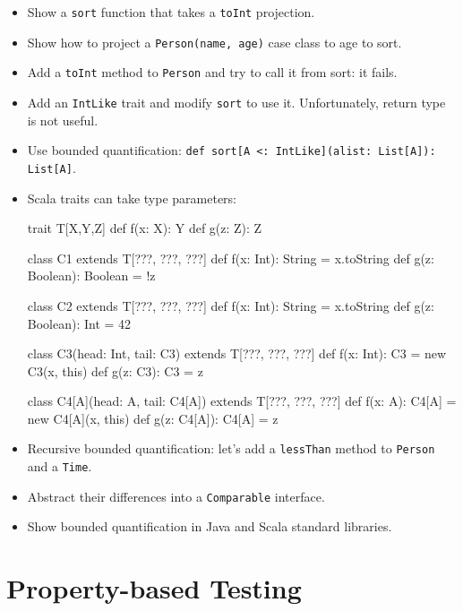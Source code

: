 \documentclass[9pt]{extbook}
\begin{document}
\begin{itemize}

  \item Show a \lstinline|sort| function that takes a \lstinline|toInt| projection.

  \item Show how to project a \lstinline|Person(name, age)| case class to age to sort.

  \item Add a \lstinline|toInt| method to \lstinline|Person| and try to call it from sort: it fails.

  \item Add an \lstinline|IntLike| trait and modify \lstinline|sort| to use it. Unfortunately, return
    type is not useful.

  \item Use bounded quantification: \lstinline|def sort[A <: IntLike](alist: List[A]): List[A]|.

  \item Scala traits can take type parameters:

    \begin{scalacode}
trait T[X,Y,Z] {
  def f(x: X): Y
  def g(z: Z): Z
}

class C1 extends T[???, ???, ???] {
  def f(x: Int): String = x.toString
  def g(z: Boolean): Boolean = !z
}

class C2 extends T[???, ???, ???] {
  def f(x: Int): String = x.toString
  def g(z: Boolean): Int = 42
}

class C3(head: Int, tail: C3) extends T[???, ???, ???] {
  def f(x: Int): C3 = new C3(x, this)
  def g(z: C3): C3 = z
}

class C4[A](head: A, tail: C4[A]) extends T[???, ???, ???] {
  def f(x: A): C4[A] = new C4[A](x, this)
  def g(z: C4[A]): C4[A] = z
}
\end{scalacode}


\item Recursive bounded quantification: let's add a \lstinline|lessThan| method to \lstinline|Person|
  and a \lstinline|Time|.

\item Abstract their differences into a \lstinline|Comparable| interface.

\item Show bounded quantification in Java and Scala standard libraries.

\end{itemize}

\chapter{Property-based Testing}
\end{document}
